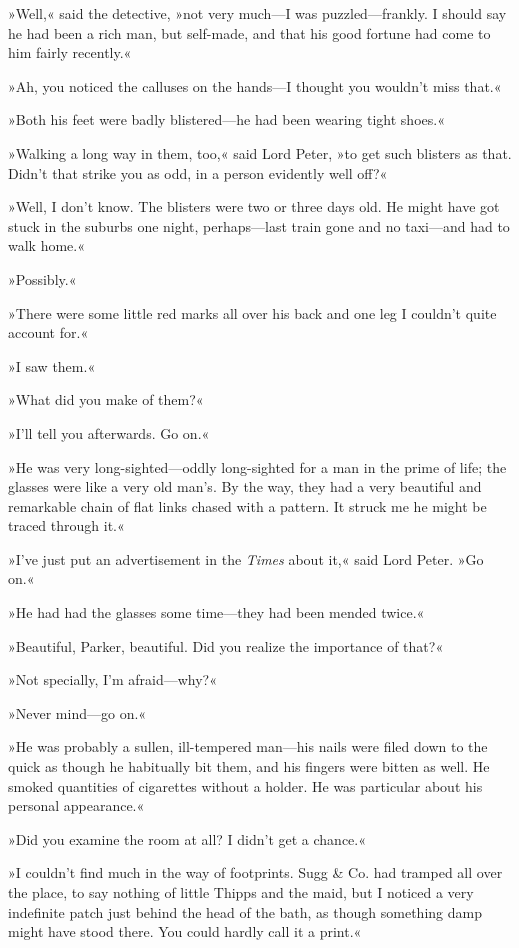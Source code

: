 »Well,« said the detective, »not very much—I was puzzled—frankly. I should say he had been a rich man, but self-made, and that his good fortune had come to him fairly recently.«

»Ah, you noticed the calluses on the hands—I thought you wouldn't miss that.«

»Both his feet were badly blistered—he had been wearing tight shoes.«

»Walking a long way in them, too,« said Lord Peter, »to get such blisters as that. Didn't that strike you as odd, in a person evidently well off?«

»Well, I don't know. The blisters were two or three days old. He might have got stuck in the suburbs one night, perhaps—last train gone and no taxi—and had to walk home.«

»Possibly.«

»There were some little red marks all over his back and one leg I couldn't quite account for.«

»I saw them.«

»What did you make of them?«

»I'll tell you afterwards. Go on.«

»He was very long-sighted—oddly long-sighted for a man in the prime of life; the glasses were like a very old man's. By the way, they had a very beautiful and remarkable chain of flat links chased with a pattern. It struck me he might be traced through it.«

»I've just put an advertisement in the \textit{Times} about it,« said Lord Peter. »Go on.«

»He had had the glasses some time—they had been mended twice.«

»Beautiful, Parker, beautiful. Did you realize the importance of that?«

»Not specially, I'm afraid—why?«

»Never mind—go on.«

»He was probably a sullen, ill-tempered man—his nails were filed down to the quick as though he habitually bit them, and his fingers were bitten as well. He smoked quantities of cigarettes without a holder. He was particular about his personal appearance.«

»Did you examine the room at all? I didn't get a chance.«

»I couldn't find much in the way of footprints. Sugg \& Co. had tramped all over the place, to say nothing of little Thipps and the maid, but I noticed a very indefinite patch just behind the head of the bath, as though something damp might have stood there. You could hardly call it a print.«

